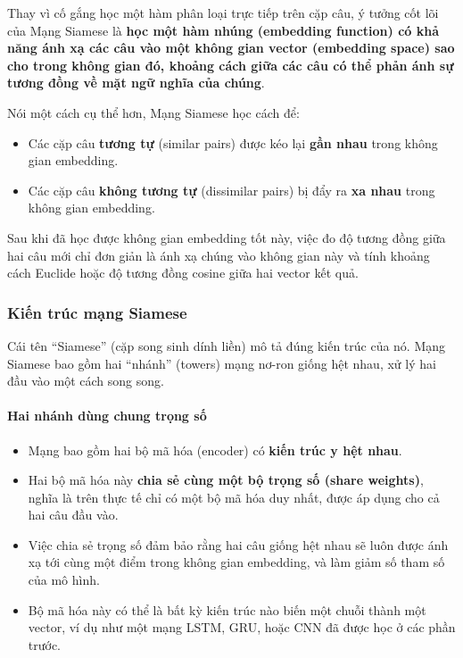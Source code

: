 Thay vì cố gắng học một hàm phân loại trực tiếp trên cặp câu, ý tưởng cốt lõi của Mạng Siamese là \textbf{học một hàm nhúng (embedding function) có khả năng ánh xạ các câu vào một không gian vector (embedding space) sao cho trong không gian đó, khoảng cách giữa các câu có thể phản ánh sự tương đồng về mặt ngữ nghĩa của chúng}.

Nói một cách cụ thể hơn, Mạng Siamese học cách để:
\begin{itemize}
    \item Các cặp câu \textbf{tương tự} (similar pairs) được kéo lại \textbf{gần nhau} trong không gian embedding.
    \item Các cặp câu \textbf{không tương tự} (dissimilar pairs) bị đẩy ra \textbf{xa nhau} trong không gian embedding.
\end{itemize}

Sau khi đã học được không gian embedding tốt này, việc đo độ tương đồng giữa hai câu mới chỉ đơn giản là ánh xạ chúng vào không gian này và tính khoảng cách Euclide hoặc độ tương đồng cosine giữa hai vector kết quả.

\subsubsection{Kiến trúc mạng Siamese}
\label{ssec:siamese_architecture}

Cái tên “Siamese” (cặp song sinh dính liền) mô tả đúng kiến trúc của nó. Mạng Siamese bao gồm hai “nhánh” (towers) mạng nơ-ron giống hệt nhau, xử lý hai đầu vào một cách song song.

\paragraph{Hai nhánh dùng chung trọng số}
\begin{itemize}
    \item Mạng bao gồm hai bộ mã hóa (encoder) có \textbf{kiến trúc y hệt nhau}.
    \item Hai bộ mã hóa này \textbf{chia sẻ cùng một bộ trọng số (share weights)}, nghĩa là trên thực tế chỉ có một bộ mã hóa duy nhất, được áp dụng cho cả hai câu đầu vào.
    \item Việc chia sẻ trọng số đảm bảo rằng hai câu giống hệt nhau sẽ luôn được ánh xạ tới cùng một điểm trong không gian embedding, và làm giảm số tham số của mô hình.
    \item Bộ mã hóa này có thể là bất kỳ kiến trúc nào biến một chuỗi thành một vector, ví dụ như một mạng LSTM, GRU, hoặc CNN đã được học ở các phần trước.
\end{itemize}

